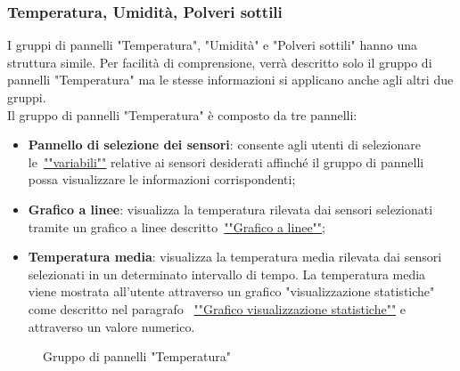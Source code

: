\subsubsection{Temperatura, Umidità, Polveri sottili}
I gruppi di pannelli "Temperatura", "Umidità" e "Polveri sottili" hanno una struttura simile. Per facilità di comprensione, verrà descritto solo il gruppo di pannelli "Temperatura" ma le stesse informazioni si applicano anche agli altri due gruppi.\\ 
Il gruppo di pannelli "Temperatura" è composto da tre pannelli:
\begin{itemize}
    \item \textbf{Pannello di selezione dei sensori}: consente agli utenti di selezionare le~\hyperlink{par:variabili_panel}{""variabili""} relative ai sensori desiderati affinché il gruppo di pannelli possa visualizzare le informazioni corrispondenti;
    \item \textbf{Grafico a linee}: visualizza la temperatura rilevata dai sensori selezionati tramite un grafico a linee descritto~\hyperlink{par:grafico_linee}{""Grafico a linee""};
    \item \textbf{Temperatura media}: visualizza la temperatura media rilevata dai sensori selezionati in un determinato intervallo di tempo. La temperatura media viene mostrata all'utente attraverso un grafico "visualizzazione statistiche" come descritto nel paragrafo ~\hyperlink{par:visu_stat}{""Grafico visualizzazione statistiche""} e attraverso un valore numerico.
\end{itemize}
\begin{figure}[H]
    \centering
    \caption{Gruppo di pannelli "Temperatura"}
    \label{fig:my_label}
\end{figure}

